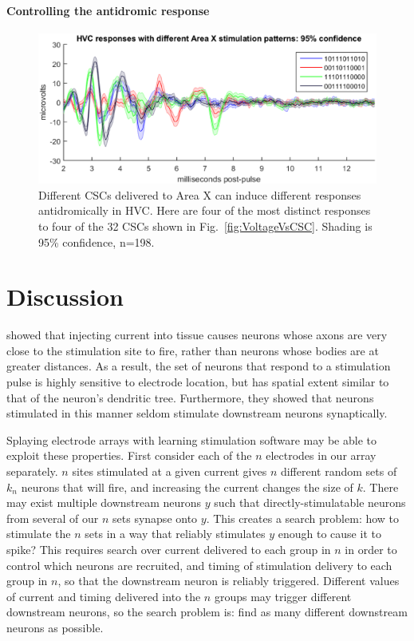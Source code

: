 \documentclass[10pt,letterpaper]{article}
\newcommand\fig[1]{Fig.~\ref{#1}}
\renewcommand{\subsubsection}[1]{\paragraph{#1}}
\begin{document}
\subsubsection{Controlling the antidromic response}

\begin{figure}
  \includegraphics[width=\textwidth]{HVCresponseVsCSC}
  \caption{Different CSCs delivered to Area X can induce different responses antidromically in HVC.  Here are four of the most distinct responses to four of the 32 CSCs shown in \fig{fig:VoltageVsCSC}.  Shading is 95\% confidence, n=198.}
  \label{fig:HVCresponseVsCSC}
\end{figure}


\section{Discussion}

\cite{Histed2009stimulation} showed that injecting current into tissue causes neurons whose axons are very close to the stimulation site to fire, rather than neurons whose bodies are at greater distances.  As a result, the set of neurons that respond to a stimulation pulse is highly sensitive to electrode location, but has spatial extent similar to that of the neuron's dendritic tree.  Furthermore, they showed that neurons stimulated in this manner seldom stimulate downstream neurons synaptically.

Splaying electrode arrays with learning stimulation software may be able to exploit these properties.  First consider each of the $n$ electrodes in our array separately.  $n$ sites stimulated at a given current gives $n$ different random sets of $k_n$ neurons that will fire, and increasing the current changes the size of $k$.  There may exist multiple downstream neurons $y$ such that directly-stimulatable neurons from several of our $n$ sets synapse onto $y$.  This creates a search problem: how to stimulate the $n$ sets in a way that reliably stimulates $y$ enough to cause it to spike?  This requires search over current delivered to each group in $n$ in order to control which neurons are recruited, and timing of stimulation delivery to each group in $n$, so that the downstream neuron is reliably triggered.  Different values of current and timing delivered into the $n$ groups may trigger different downstream neurons, so the search problem is: find as many different downstream neurons as possible.
\end{document}
